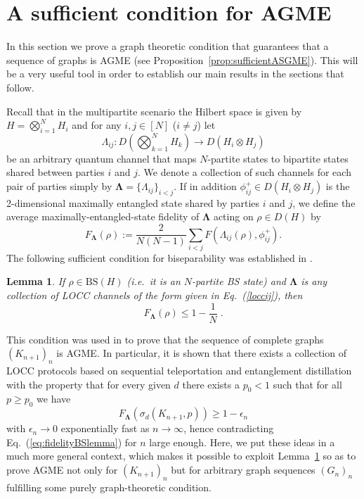 \documentclass[a4paper,onecolumn,accepted=2024-12-14]{quantumarticle}
\newtheorem{lemma}[theorem]{Lemma}
\theoremstyle{plain}
\begin{document}
\section{A sufficient condition for AGME}\label{sec3}

In this section we prove a graph theoretic condition that
guarantees that a sequence of graphs is AGME (see Proposition~\ref{prop:sufficientASGME}). This will be a very useful tool in order to establish our main results in the sections that follow.

Recall that in the multipartite scenario the Hilbert space is given by $H=\bigotimes_{i=1}^NH_i$ and for any $i,j\in[N]$ ($i\neq j$) let
\begin{equation}\label{loccij}
\Lambda_{ij}\colon D\left(\bigotimes_{k=1}^{N}H_{k}\right)\rightarrow D(H_{i}\otimes H_{j})
\end{equation}
be an arbitrary quantum channel that maps $N$-partite states to bipartite states shared between parties $i$ and $j$. We denote
a collection of such channels for each pair of parties simply by
$\mathbf{\Lambda}=\{\Lambda_{ij}\}_{i<j}$. If in addition $\phi_{ij}^{+}\in D(H_i\otimes H_j)$ is the 2-dimensional maximally entangled state shared by parties $i$ and $j$, we define the average maximally-entangled-state fidelity of $\mathbf{\Lambda}$ acting on $\rho\in D(H)$ by
\begin{equation}\label{fidelitylambda}
F_\mathbf{\Lambda}(\rho):=\frac{2}{N(N-1)}\sum_{i<j}
F\left(\Lambda_{ij}(\rho),\phi_{ij}^{+}\right).
\end{equation}
The following sufficient condition for biseparability was established in \cite[Lemma 1]{ASGME}.
\begin{lemma}\label{lemmabsfidelity}
If $\rho\in \mathrm{BS}(H)$ (i.e.\ it is an $N$-partite BS state) and $\mathbf{\Lambda}$ is any collection of LOCC channels of the form given in
Eq.~(\ref{loccij}), then
\begin{equation}\label{eq:fidelityBSlemma}
F_\mathbf{\Lambda}(\rho)\leq1-\frac{1}{N}\;.
\end{equation}
\end{lemma}
This condition was used in \cite{ASGME} to prove that the sequence of
complete graphs $(K_{n+1})_n$ is AGME. In particular, it is shown that there exists a collection of LOCC protocols based on sequential teleportation and entanglement distillation with the property that for every given $d$ there exists a $p_0<1$ such that for all $p\geq p_0$ we have
\begin{equation}\label{lemma2}
F_\mathbf{\Lambda}(\sigma_d(K_{n+1},p))\geq1-\epsilon_n
\end{equation}
with $\epsilon_n\to 0$ exponentially fast as $n\to\infty$, hence contradicting Eq.\ (\ref{eq:fidelityBSlemma}) for $n$ large enough. Here, we put these ideas in a much more general context, which makes it possible to exploit
Lemma~\ref{lemmabsfidelity} so as to prove AGME not only for $(K_{n+1})_n$ but for arbitrary graph sequences $(G_n)_n$ fulfilling some purely graph-theoretic condition.
\end{document}
